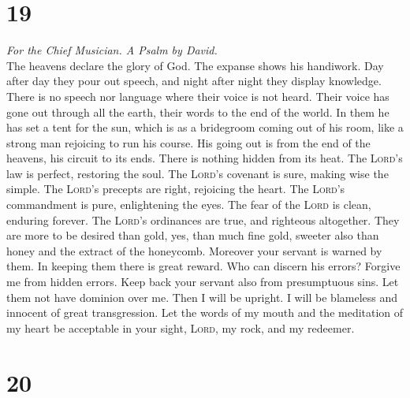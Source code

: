 \hypertarget{section-18}{%
\section{19}\label{section-18}}

\emph{For the Chief Musician. A Psalm by David.}\\
 The heavens declare the glory of God. The expanse shows
his handiwork.  Day after day they pour out speech, and
night after night they display knowledge.  There is no
speech nor language where their voice is not heard.  Their
voice has gone out through all the earth, their words to the end of the
world. In them he has set a tent for the sun,  which is as
a bridegroom coming out of his room, like a strong man rejoicing to run
his course.  His going out is from the end of the heavens,
his circuit to its ends. There is nothing hidden from its heat.
 The \textsc{Lord}'s law is perfect, restoring the soul.
The \textsc{Lord}'s covenant is sure, making wise the simple.
 The \textsc{Lord}'s precepts are right, rejoicing the
heart. The \textsc{Lord}'s commandment is pure, enlightening the eyes.
 The fear of the \textsc{Lord} is clean, enduring forever.
The \textsc{Lord}'s ordinances are true, and righteous altogether.
 They are more to be desired than gold, yes, than much
fine gold, sweeter also than honey and the extract of the honeycomb.
 Moreover your servant is warned by them. In keeping them
there is great reward.  Who can discern his errors?
Forgive me from hidden errors.  Keep back your servant
also from presumptuous sins. Let them not have dominion over me. Then I
will be upright. I will be blameless and innocent of great
transgression.  Let the words of my mouth and the
meditation of my heart be acceptable in your sight, \textsc{Lord}, my
rock, and my redeemer.

\hypertarget{section-19}{%
\section{20}\label{section-19}}

